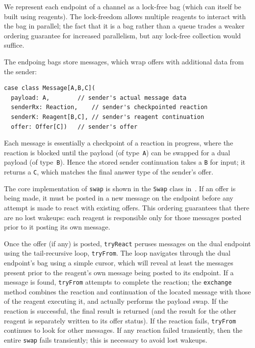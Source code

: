 \documentclass[preprint,nocopyrightspace]{sigplanconf}
\begin{document}
We represent each endpoint of a channel as a lock-free bag (which can itself be
built using reagents).  The lock-freedom allows multiple reagents to interact
with the bag in parallel; the fact that it is a bag rather than a queue trades a
weaker ordering guarantee for increased parallelism, but any lock-free
collection would suffice.

The endpoing bags store messages, which wrap offers with additional data from
the sender:
\begin{lstlisting}
case class Message[A,B,C](
  payload: A,		 // sender's actual message data
  senderRx: Reaction,	 // sender's checkpointed reaction
  senderK: Reagent[B,C], // sender's reagent continuation
  offer: Offer[C])	 // sender's offer
\end{lstlisting}
Each message is essentially a checkpoint of a reaction in progress, where the
reaction is blocked until the payload (of type~\lstinline{A}) can be swapped for
a dual payload (of type~\lstinline{B}).  Hence the stored sender continuation
takes a \lstinline{B} for input; it returns a \lstinline{C}, which matches the
final answer type of the sender's offer.

The core implementation of \lstinline{swap} is shown in the \lstinline{Swap}
class in~.  If an offer is being made, it must be posted in a new
message on the endpoint before any attempt is made to react with existing
offers.  This ordering guarantees that there are no lost wakeups: each reagent
is responsible only for those messages posted prior to it posting its own
message.  

Once the offer (if any) is posted, \lstinline{tryReact} peruses messages on the
dual endpoint using the tail-recursive loop, \lstinline{tryFrom}.  The loop
navigates through the dual endpoint's bag using a simple cursor, which will
reveal at least the messages present prior to the reagent's own message being
posted to its endpoint.  If a message is found, \lstinline{tryFrom} attempts to
complete the reaction; the \lstinline{exchange} method combines the reaction and
continuation of the located message with those of the reagent executing it, and
actually performs the payload swap.  If the reaction is successful, the final
result is returned (and the result for the other reagent is separately written
to its offer status).  If the reaction fails, \lstinline{tryFrom} continues to
look for other messages.  If any reaction failed transiently, then the entire
\lstinline{swap} fails transiently; this is necessary to avoid lost wakeups.
\end{document}
